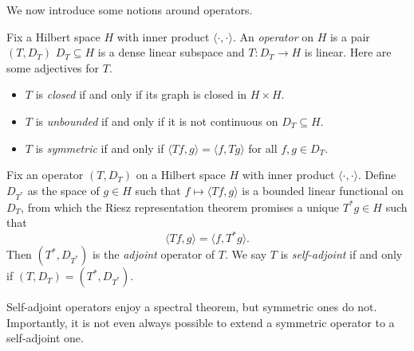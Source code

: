 \documentclass{article}
\begin{document}
We now introduce some notions around operators.
\begin{definition}[operator]
	Fix a Hilbert space $H$ with inner product $\langle\cdot,\cdot\rangle$. An \textit{operator} on $H$ is a pair $(T,D_T)$ $D_T\subseteq H$ is a dense linear subspace and $T\colon D_T\to H$ is linear. Here are some adjectives for $T$.
	\begin{itemize}
		\item $T$ is \textit{closed} if and only if its graph is closed in $H\times H$.
		\item $T$ is \textit{unbounded} if and only if it is not continuous on $D_T\subseteq H$.
		\item $T$ is \textit{symmetric} if and only if $\langle Tf,g\rangle=\langle f,Tg\rangle$ for all $f,g\in D_T$.
	\end{itemize}
\end{definition}
\begin{definition}[adjoint]
	Fix an operator $(T,D_T)$ on a Hilbert space $H$ with inner product $\langle\cdot,\cdot\rangle$. Define $D_{T^*}$ as the space of $g\in H$ such that $f\mapsto\langle Tf,g\rangle$ is a bounded linear functional on $D_T$, from which the Riesz representation theorem promises a unique $T^*g\in H$ such that
	\[\langle Tf,g\rangle=\langle f,T^*g\rangle.\]
	Then $(T^*,D_{T^*})$ is the \textit{adjoint} operator of $T$. We say $T$ is \textit{self-adjoint} if and only if $(T,D_T)=(T^*,D_{T^*})$.
\end{definition}
Self-adjoint operators enjoy a spectral theorem, but symmetric ones do not. Importantly, it is not even always possible to extend a symmetric operator to a self-adjoint one.
\end{document}
